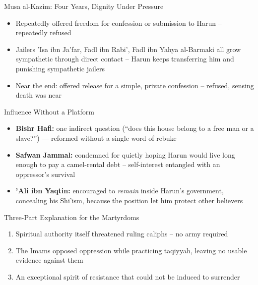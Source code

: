 \begin{frame}{Musa al-Kazim: Four Years, Dignity Under Pressure}
\begin{itemize}[itemsep=5pt]
  \item Repeatedly offered freedom for confession or submission to Harun -- repeatedly refused
  \item Jailers 'Isa ibn Ja'far, Fadl ibn Rabi', Fadl ibn Yahya al-Barmaki all grow sympathetic through direct contact -- Harun keeps transferring him and punishing sympathetic jailers
  \item Near the end: offered release for a simple, private confession -- refused, sensing death was near
\end{itemize}
\end{frame}

\begin{frame}{Influence Without a Platform}
\begin{itemize}[itemsep=5pt]
  \item \textbf{Bishr Hafi:} one indirect question (``does this house belong to a free man or a slave?'') --- reformed without a single word of rebuke
  \item \textbf{Safwan Jammal:} condemned for quietly hoping Harun would live long enough to pay a camel-rental debt -- self-interest entangled with an oppressor's survival
  \item \textbf{'Ali ibn Yaqtin:} encouraged to \emph{remain} inside Harun's government, concealing his Shi'ism, because the position let him protect other believers
\end{itemize}
\end{frame}

\begin{frame}{Three-Part Explanation for the Martyrdoms}
\begin{enumerate}[label=\arabic*.,itemsep=6pt]
  \item Spiritual authority itself threatened ruling caliphs -- no army required
  \item The Imams opposed oppression while practicing taqiyyah, leaving no usable evidence against them
  \item An exceptional spirit of resistance that could not be induced to surrender
\end{enumerate}
\end{frame}

